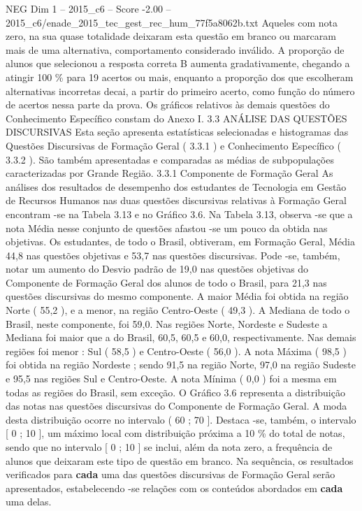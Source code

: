 \begin{textsample}{NEG Dim 1 – 2015\_c6 – Score -2.00 – 2015\_c6/enade\_2015\_tec\_gest\_rec\_hum\_77f5a8062b.txt}
Aqueles com nota zero, na sua quase totalidade deixaram esta questão em branco ou marcaram mais de uma alternativa, comportamento considerado inválido.
A proporção de alunos que selecionou a resposta correta B aumenta gradativamente, chegando a atingir 100 \% para 19 acertos ou mais, enquanto a proporção dos que escolheram alternativas incorretas decai, a partir do primeiro acerto, como função do número de acertos nessa parte da prova.
Os gráficos relativos às demais questões do Conhecimento Específico constam do Anexo I. 3.3 ANÁLISE DAS QUESTÕES DISCURSIVAS Esta seção apresenta estatísticas selecionadas e histogramas das Questões Discursivas de Formação Geral ( 3.3.1 ) e Conhecimento Específico ( 3.3.2 ).
São também apresentadas e comparadas as médias de subpopulações caracterizadas por Grande Região. 3.3.1 Componente de Formação Geral As análises dos resultados de desempenho dos estudantes de Tecnologia em Gestão de Recursos Humanos nas duas questões discursivas relativas à Formação Geral encontram -se na Tabela 3.13 e no Gráfico 3.6.
Na Tabela 3.13, observa -se que a nota Média nesse conjunto de questões afastou -se um pouco da obtida nas objetivas.
Os estudantes, de todo o Brasil, obtiveram, em Formação Geral, Média 44,8 nas questões objetivas e 53,7 nas questões discursivas.
Pode -se, também, notar um aumento do Desvio padrão de 19,0 nas questões objetivas do Componente de Formação Geral dos alunos de todo o Brasil, para 21,3 nas questões discursivas do mesmo componente.
A maior Média foi obtida na região Norte ( 55,2 ), e a menor, na região Centro-Oeste ( 49,3 ).
A Mediana de todo o Brasil, neste componente, foi 59,0.
Nas regiões Norte, Nordeste e Sudeste a Mediana foi maior que a do Brasil, 60,5, 60,5 e 60,0, respectivamente.
Nas demais regiões foi menor : Sul ( 58,5 ) e Centro-Oeste ( 56,0 ).
A nota Máxima ( 98,5 ) foi obtida na região Nordeste ; sendo 91,5 na região Norte, 97,0 na região Sudeste e 95,5 nas regiões Sul e Centro-Oeste.
A nota Mínima ( 0,0 ) foi a mesma em todas as regiões do Brasil, sem exceção.
O Gráfico 3.6 representa a distribuição das notas nas questões discursivas do Componente de Formação Geral.
A moda desta distribuição ocorre no intervalo ( 60 ; 70 ].
Destaca -se, também, o intervalo [ 0 ; 10 ], um máximo local com distribuição próxima a 10 \% do total de notas, sendo que no intervalo [ 0 ; 10 ] se inclui, além da nota zero, a frequência de alunos que deixaram este tipo de questão em branco.
Na sequência, os resultados verificados para \textbf{cada} uma das questões discursivas de Formação Geral serão apresentados, estabelecendo -se relações com os conteúdos abordados em \textbf{cada} uma delas.

\end{textsample}
